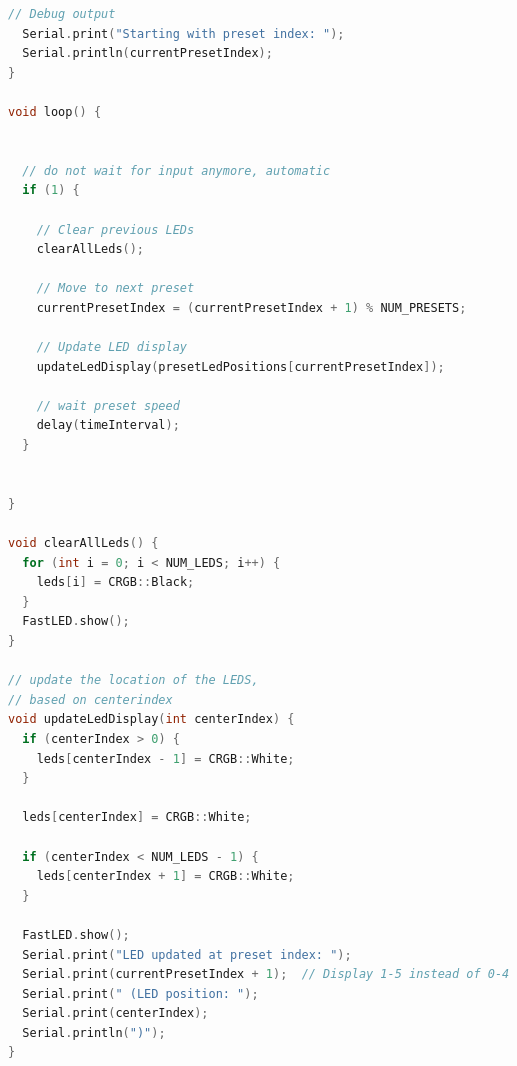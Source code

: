 \begin{lstlisting}[style=cstyle, caption=Cpp Code of the RGB strip with automatic changes, label=lst:RGBcodeAutomatic, language=c++ ]
  // Debug output
  Serial.print("Starting with preset index: ");
  Serial.println(currentPresetIndex);
}

void loop() {

  
  // do not wait for input anymore, automatic
  if (1) {   
    
    // Clear previous LEDs
    clearAllLeds();
    
    // Move to next preset
    currentPresetIndex = (currentPresetIndex + 1) % NUM_PRESETS;
    
    // Update LED display
    updateLedDisplay(presetLedPositions[currentPresetIndex]);
    
    // wait preset speed
    delay(timeInterval);
  }
  

}

void clearAllLeds() {
  for (int i = 0; i < NUM_LEDS; i++) {
    leds[i] = CRGB::Black;
  }
  FastLED.show();
}

// update the location of the LEDS, 
// based on centerindex
void updateLedDisplay(int centerIndex) {
  if (centerIndex > 0) {
    leds[centerIndex - 1] = CRGB::White;
  }
  
  leds[centerIndex] = CRGB::White;
  
  if (centerIndex < NUM_LEDS - 1) {
    leds[centerIndex + 1] = CRGB::White;
  }
  
  FastLED.show();
  Serial.print("LED updated at preset index: ");
  Serial.print(currentPresetIndex + 1);  // Display 1-5 instead of 0-4
  Serial.print(" (LED position: ");
  Serial.print(centerIndex);
  Serial.println(")");
}
\end{lstlisting}

